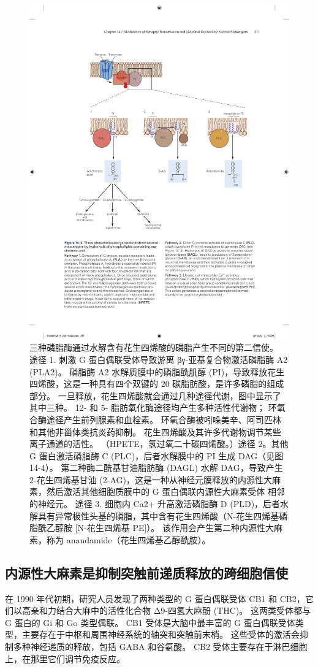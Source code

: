 \begin{figure}[htbp]
	\centering
	\includegraphics[width=0.8\linewidth]{chap14/fig_14_6}
	\caption{三种磷脂酶通过水解含有花生四烯酸的磷脂产生不同的第二信使。 途径 1. 刺激 G 蛋白偶联受体导致游离 βγ-亚基复合物激活磷脂酶 A2 (PLA2)。 磷脂酶 A2 水解质膜中的磷脂酰肌醇 (PI)，导致释放花生四烯酸，这是一种具有四个双键的 20 碳脂肪酸，是许多磷脂的组成部分。 一旦释放，花生四烯酸就会通过几种途径代谢，图中显示了其中三种。 12- 和 5- 脂肪氧化酶途径均产生多种活性代谢物； 环氧合酶途径产生前列腺素和血栓素。 环氧合酶被吲哚美辛、阿司匹林和其他非甾体类抗炎药抑制。 花生四烯酸及其许多代谢物调节某些离子通道的活性。 （HPETE，氢过氧二十碳四烯酸。）途径 2。其他 G 蛋白激活磷脂酶 C (PLC)，后者水解膜中的 PI 生成 DAG（见图 14-4）。 第二种酶二酰基甘油脂肪酶 (DAGL) 水解 DAG，导致产生 2-花生四烯基甘油 (2-AG)，这是一种从神经元膜释放的内源性大麻素，然后激活其他细胞质膜中的 G 蛋白偶联内源性大麻素受体 相邻的神经元。 途径 3. 细胞内 Ca2+ 升高激活磷脂酶 D (PLD)，后者水解具有异常极性头基的磷脂，其中含有花生四烯酸（N-花生四烯基磷脂酰乙醇胺 [N-花生四烯基 PE]）。 该作用会产生第二种内源性大麻素，称为 anandamide（花生四烯基乙醇酰胺）。}
	\label{fig:14_6}
\end{figure}


\subsection{内源性大麻素是抑制突触前递质释放的跨细胞信使}
在 1990 年代初期，研究人员发现了两种类型的 G 蛋白偶联受体 CB1 和 CB2，它们以高亲和力结合大麻中的活性化合物 Δ9-四氢大麻酚 (THC)。 
这两类受体都与 G 蛋白的 Gi 和 Go 类型偶联。 
CB1 受体是大脑中最丰富的 G 蛋白偶联受体类型，主要存在于中枢和周围神经系统的轴突和突触前末梢。 
这些受体的激活会抑制多种神经递质的释放，包括 GABA 和谷氨酸。 
CB2 受体主要存在于淋巴细胞上，在那里它们调节免疫反应。


